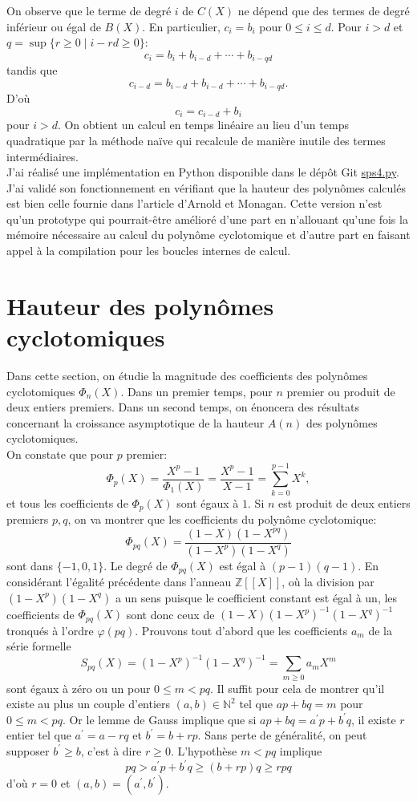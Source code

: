 \documentclass{article}
\newcounter{lemme}
\theoremstyle{break}                  %
\begin{document}
On observe que le terme de degré $i$ de $C(X)$ ne dépend que des termes de degré inférieur ou égal de $B(X)$. En particulier, $c_i = b_i$ pour $0 \le i \le d$. Pour $i > d$ et $q = \sup \{r \ge 0 \mid i-rd \ge 0\}$:
$$c_i = b_i + b_{i-d} + \cdots + b_{i-qd}$$ tandis que
$$c_{i-d} = b_{i-d} + b_{i-d} + \cdots + b_{i-qd}.$$ D'où
$$c_i = c_{i-d} + b_i$$ pour $i > d$. On obtient un calcul en temps linéaire au lieu d'un temps quadratique par la méthode naïve qui recalcule de manière inutile des termes intermédiaires.\\

J'ai réalisé une implémentation en Python disponible dans le dépôt Git \href{https://github.com/jpmjpmjpm/cyclotom-fast/blob/master/cyclotomfast/sps4.py}{sps4.py}. J'ai validé son fonctionnement en vérifiant que la hauteur des polynômes calculés est bien celle fournie dans l'article d'Arnold et Monagan. Cette version n'est qu'un prototype qui pourrait-être amélioré d'une part en n'allouant qu'une fois la mémoire nécessaire au calcul du polynôme cyclotomique et d'autre part en faisant appel à la compilation pour les boucles internes de calcul.\\

\section*{Hauteur des polynômes cyclotomiques}\label{sec:hauteur}
Dans cette section, on étudie la magnitude des coefficients des polynômes cyclotomiques $\Phi_n(X)$. Dans un premier temps, pour $n$ premier ou produit de deux entiers premiers. Dans un second temps, on énoncera des résultats concernant la croissance asymptotique de la hauteur $A(n)$ des polynômes cyclotomiques.\\


On constate que pour $p$ premier:
$$\Phi_p(X) = \frac{X^p-1}{\Phi_1(X)} = \frac{X^p-1}{X-1} = \sum_{k=0}^{p-1} X^k,$$
et tous les coefficients de $\Phi_p(X)$ sont égaux à $1$. Si $n$ est produit de deux entiers premiers $p,q$, on va montrer que les coefficients du polynôme cyclotomique:
$$\Phi_{pq}(X) = \frac{(1-X)(1-X^{pq})}{(1-X^p)(1-X^q)}$$ sont dans $\{-1, 0, 1\}$. Le degré de $\Phi_{pq}(X)$ est égal à $(p-1)(q-1)$. En considérant l'égalité précédente dans l'anneau $\mathbb Z[[X]]$, où la division par $(1-X^p)(1-X^q)$ a un sens puisque le coefficient constant est égal à un, les coefficients de $\Phi_{pq}(X)$ sont donc ceux de $(1-X)(1-X^p)^{-1}(1-X^q)^{-1}$ tronqués à l'ordre $\varphi(pq)$. Prouvons tout d'abord que les coefficients $a_m$ de la série formelle
$$S_{pq}(X) = (1-X^p)^{-1}(1-X^q)^{-1} = \sum_{m \ge 0} a_m X^m$$ sont égaux à zéro ou un pour $0 \le m < pq$. Il suffit pour cela de montrer qu'il existe au plus un couple d'entiers $(a,b) \in \mathbb N^2$ tel que $ap+bq = m$ pour $0 \le m < pq$. Or le lemme de Gauss implique que si $ap+bq = a^\prime p + b^\prime q$, il existe $r$ entier tel que $a^\prime = a -rq$ et $b^\prime = b +rp$. Sans perte de généralité, on peut supposer $b^\prime \ge b$, c'est à dire $r \ge 0$. L'hypothèse $m <pq$ implique
$$pq > a^\prime p + b^\prime q \ge (b + r p)q \ge rpq$$ d'où $r=0$ et $(a,b)=(a^\prime, b^\prime)$.
\end{document}
